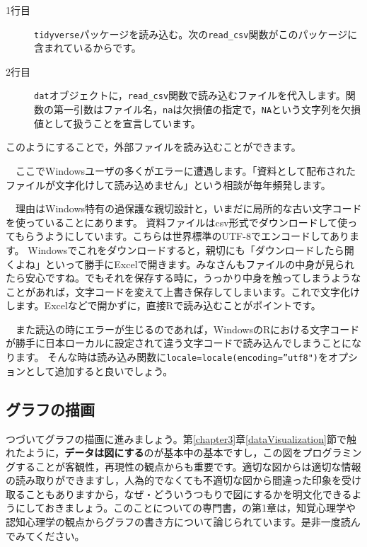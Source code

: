 \documentclass{ltjbook}
\begin{document}
\begin{description}
    \item[1行目] \texttt{tidyverse}パッケージを読み込む。次の\verb|read_csv|関数がこのパッケージに含まれているからです。
	\item[2行目] \texttt{dat}オブジェクトに，\verb|read_csv|関数で読み込むファイルを代入します。関数の第一引数はファイル名，\verb|na|は欠損値の指定で，\texttt{NA}という文字列を欠損値として扱うことを宣言しています。
\end{description}

このようにすることで，外部ファイルを読み込むことができます。


\begin{tcolorbox}[title=FAQ；ファイルの文字化け,fonttitle=\gtfamily\sffamily\bfseries,colframe=blue,colback=blue!3!]
　ここでWindowsユーザの多くがエラーに遭遇します。「資料として配布されたファイルが文字化けして読み込めません」という相談が毎年頻発します。

　理由はWindows特有の過保護な親切設計と，いまだに局所的な古い文字コードを使っていることにあります。
資料ファイルはcsv形式でダウンロードして使ってもらうようにしています。こちらは世界標準のUTF-8でエンコードしてあります。
Windowsでこれをダウンロードすると，親切にも「ダウンロードしたら開くよね」といって勝手にExcelで開きます。みなさんもファイルの中身が見られたら安心ですね。でもそれを保存する時に，うっかり中身を触ってしまうようなことがあれば，文字コードを変えて上書き保存してしまいます。これで文字化けします。Excelなどで開かずに，直接Rで読み込むことがポイントです。

　また読込の時にエラーが生じるのであれば，WindowsのRにおける文字コードが勝手に日本ローカルに設定されて違う文字コードで読み込んでしまうことになります。
そんな時は読み込み関数に\verb|locale=locale(encoding=”utf8")|をオプションとして追加すると良いでしょう。
\end{tcolorbox}


\subsection{グラフの描画}
つづいてグラフの描画に進みましょう。第\ref{chapter3}章\ref{dataVisualization}節で触れたように，\textbf{データは図にする}のが基本中の基本ですし，この図をプログラミングすることが客観性，再現性の観点からも重要です。適切な図からは適切な情報の読み取りができますし，人為的でなくても不適切な図から間違った印象を受け取ることもありますから，なぜ・どういうつもりで図にするかを明文化できるようにしておきましょう。このことについての専門書，\citet{Kieran2018}の第1章は，知覚心理学や認知心理学の観点からグラフの書き方について論じられています。是非一度読んでみてください。
\end{document}
